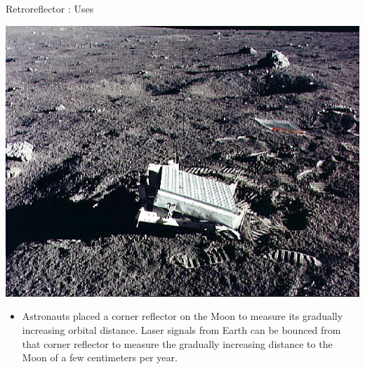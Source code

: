 \documentclass{beamer}
\begin{document}
\begin{frame}{Retroreflector : Uses}
	\begin{center}
		\includegraphics[scale=0.2]{21}
	\end{center}
	\begin{itemize}
		\item Astronauts placed a corner reflector on the Moon to measure its gradually increasing orbital distance. Laser signals from Earth can be bounced from that corner reflector to measure the gradually increasing distance to the Moon of a few centimeters per year.
	\end{itemize}
\end{frame}
\end{document}

